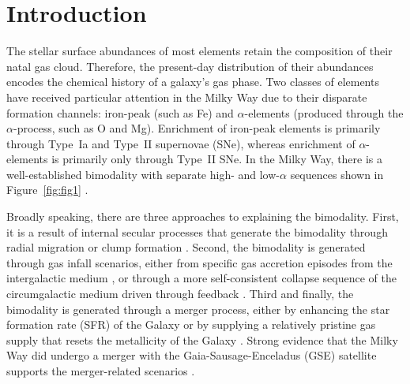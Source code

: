 \documentclass[twocolumn]{aastex631}
\begin{document}
\section{Introduction}\label{sec:intro}
The stellar surface abundances of most elements retain the composition of their natal gas cloud. Therefore, the present-day distribution of their abundances encodes the chemical history of a galaxy's gas phase. Two classes of elements have received particular attention in the Milky Way due to their disparate formation channels: iron-peak (such as Fe) and $\alpha$-elements (produced through the $\alpha$-process, such as O and Mg). Enrichment of iron-peak elements is primarily through Type~Ia and Type~II supernovae (SNe), whereas enrichment of $\alpha$-elements is primarily only through Type~II SNe. In the Milky Way, there is a well-established bimodality with separate high- and low-$\alpha$ sequences shown in Figure~\ref{fig:fig1} \citep{1996ASPC...92..307G,1998A&A...338..161F,2004AN....325....3F,2006MNRAS.367.1329R,2011A&A...535L..11A,2012A&A...545A..32A,2014A&A...562A..71B,2014ApJ...796...38N,2020MNRAS.493.2952H}.

Broadly speaking, there are three approaches to explaining the bimodality. First, it is a result of internal secular processes that generate the bimodality through radial migration \citep{2009MNRAS.396..203S,2021MNRAS.507.5882S,2023MNRAS.523.3791C} or clump formation \citep{2019MNRAS.484.3476C,2020MNRAS.492.4716B,2021MNRAS.502..260B,2023ApJ...953..128G}. Second, the bimodality is generated through gas infall scenarios, either from specific gas accretion episodes from the intergalactic medium \citep{1997ApJ...477..765C,2009IAUS..254..191C,2017MNRAS.472.3637G,2019A&A...623A..60S}, or through a more self-consistent collapse sequence of the circumgalactic medium driven through feedback \citep{2021MNRAS.501.5176K}. Third and finally, the bimodality is generated through a merger process, either by enhancing the star formation rate (SFR) of the Galaxy \citep{2004ApJ...612..894B,2005ApJ...630..298B,2007ApJ...658...60B,2010MNRAS.402.1489R} or by supplying a relatively pristine gas supply that resets the metallicity of the Galaxy \citep{2020MNRAS.491.5435B,2024MNRAS.528L.122C}. Strong evidence that the Milky Way did undergo a merger with the Gaia-Sausage-Enceladus (GSE) satellite supports the merger-related scenarios \citep{2018MNRAS.478..611B,2018Natur.563...85H,2020ApJ...901...48N,2024ApJ...972..112C}.
\end{document}
